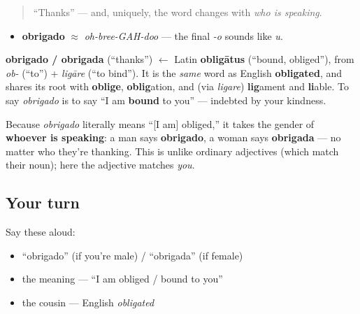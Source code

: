 \label{lesson:PT-C01-obrigado}



\begin{quote}
\textquotedblleft{}Thanks\textquotedblright{} — and, uniquely, the word changes with \emph{who is speaking}.
\end{quote}

\begin{sounds}
\begin{itemize}
\raggedright
  \item \textbf{obrigado} $\approx$ \emph{oh-bree-GAH-doo} — the final \emph{-o} sounds like \emph{u}.
\end{itemize}
\end{sounds}

\begin{cousinweb}
\textbf{obrigado / obrigada} (\textquotedblleft{}thanks\textquotedblright{}) $\leftarrow$ Latin \textbf{obligātus} (\textquotedblleft{}bound, obliged\textquotedblright{}), from \emph{ob-} (\textquotedblleft{}to\textquotedblright{}) + \emph{ligāre} (\textquotedblleft{}to bind\textquotedblright{}). It is the \emph{same} word as English \textbf{obligated}, and shares its root with \textbf{oblige}, \textbf{oblig}ation, and (via \emph{ligare}) \textbf{lig}ament and \textbf{li}able. To say \emph{obrigado} is to say \textquotedblleft{}I am \textbf{bound} to you\textquotedblright{} — indebted by your kindness.
\end{cousinweb}

\begin{grammarlens}[title={Grammar Lens: it agrees with the \emph{speaker}}]
Because \emph{obrigado} literally means \textquotedblleft{}{[}I am{]} obliged,\textquotedblright{} it takes the gender of \textbf{whoever is speaking}: a man says \textbf{obrigado}, a woman says \textbf{obrigada} — no matter who they're thanking. This is unlike ordinary adjectives (which match their noun); here the adjective matches \emph{you}.
\end{grammarlens}

\subsection*{Your turn}
Say these aloud:

\begin{itemize}
\raggedright
  \item \textquotedblleft{}obrigado\textquotedblright{} (if you're male) / \textquotedblleft{}obrigada\textquotedblright{} (if female)
  \item the meaning — \textquotedblleft{}I am obliged / bound to you\textquotedblright{}
  \item the cousin — English \emph{obligated}
\end{itemize}

